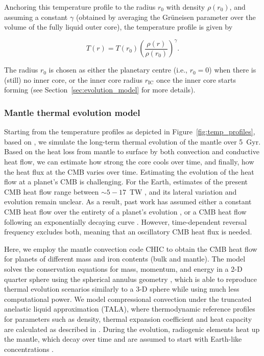 \documentclass[draft]{agujournal2019} %
\begin{document}
Anchoring this temperature profile to the radius $r_{\mathrm{0}}$ with density $\rho(r_{\mathrm{0}})$, and assuming a constant $\gamma$ (obtained by averaging the Gr\"uneisen parameter over the volume of the fully liquid outer core), the temperature profile is given by

\begin{linenomath*}
\begin{equation}\label{eq:adiabat}
    T(r) = T(r_{\mathrm{0}})\left ( \frac{\rho(r)}{\rho(r_{\mathrm{0}})} \right )^\gamma .
\end{equation}
\end{linenomath*}

The radius $r_{\mathrm{0}}$ is chosen as either the planetary centre (i.e., $r_{\mathrm{0}}=0$) when there is (still) no inner core, or the inner core radius $r_{\mathrm{IC}}$ once the inner core starts forming (see Section~\ref{sec:evolution_model} for more details).


\subsubsection{Mantle thermal evolution model} \label{sec:evolution_mantle}

Starting from the temperature profiles as depicted in Figure~\ref{fig:temp_profiles}, based on , we simulate the long-term thermal evolution of the mantle over 5~Gyr. Based on the heat loss from mantle to surface by both convection and conductive heat flow, we can estimate how strong the core cools over time, and finally, how the heat flux at the CMB varies over time.
Estimating the evolution of the heat flow at a planet's CMB is challenging. For the Earth, estimates of the present CMB heat flow range between $\sim 5-17$~TW \cite{lay2008core}, and its lateral variation and evolution remain unclear. As a result, past work has assumed either a constant CMB heat flow over the entirety of a planet's evolution \cite{labrosse_thermal_2003}, or a CMB heat flow following an exponentially decaying curve \cite{labrosse_thermal_2015}. However, time-dependent reversal frequency excludes both, meaning that an oscillatory CMB heat flux is needed. 

Here, we employ the mantle convection code CHIC \cite{NOACK201740} to obtain the CMB heat flow for planets of different mass and iron contents (bulk and mantle). The model solves the conservation equations for mass, momentum, and energy in a 2-D quarter sphere using the spherical annulus geometry \cite{hernlund2008modeling}, which is able to reproduce thermal evolution scenarios similarly to a 3-D sphere while using much less computational power. We model compressional convection under the truncated anelastic liquid approximation (TALA), where thermodynamic reference profiles for parameters such as density, thermal expansion coefficient and heat capacity are calculated as described in .  
During the evolution, radiogenic elements heat up the mantle, which decay over time and are assumed to start with Earth-like concentrations \cite{mcdonough1995composition}. 
\end{document}
